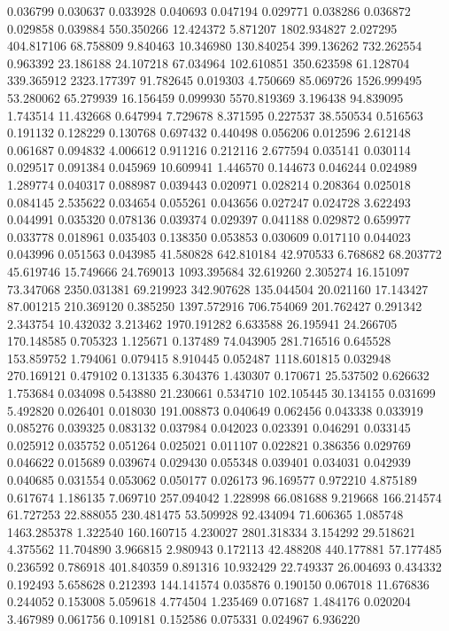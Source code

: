 0.036799
0.030637
0.033928
0.040693
0.047194
0.029771
0.038286
0.036872
0.029858
0.039884
550.350266
12.424372
5.871207
1802.934827
2.027295
404.817106
68.758809
9.840463
10.346980
130.840254
399.136262
732.262554
0.963392
23.186188
24.107218
67.034964
102.610851
350.623598
61.128704
339.365912
2323.177397
91.782645
0.019303
4.750669
85.069726
1526.999495
53.280062
65.279939
16.156459
0.099930
5570.819369
3.196438
94.839095
1.743514
11.432668
0.647994
7.729678
8.371595
0.227537
38.550534
0.516563
0.191132
0.128229
0.130768
0.697432
0.440498
0.056206
0.012596
2.612148
0.061687
0.094832
4.006612
0.911216
0.212116
2.677594
0.035141
0.030114
0.029517
0.091384
0.045969
10.609941
1.446570
0.144673
0.046244
0.024989
1.289774
0.040317
0.088987
0.039443
0.020971
0.028214
0.208364
0.025018
0.084145
2.535622
0.034654
0.055261
0.043656
0.027247
0.024728
3.622493
0.044991
0.035320
0.078136
0.039374
0.029397
0.041188
0.029872
0.659977
0.033778
0.018961
0.035403
0.138350
0.053853
0.030609
0.017110
0.044023
0.043996
0.051563
0.043985
41.580828
642.810184
42.970533
6.768682
68.203772
45.619746
15.749666
24.769013
1093.395684
32.619260
2.305274
16.151097
73.347068
2350.031381
69.219923
342.907628
135.044504
20.021160
17.143427
87.001215
210.369120
0.385250
1397.572916
706.754069
201.762427
0.291342
2.343754
10.432032
3.213462
1970.191282
6.633588
26.195941
24.266705
170.148585
0.705323
1.125671
0.137489
74.043905
281.716516
0.645528
153.859752
1.794061
0.079415
8.910445
0.052487
1118.601815
0.032948
270.169121
0.479102
0.131335
6.304376
1.430307
0.170671
25.537502
0.626632
1.753684
0.034098
0.543880
21.230661
0.534710
102.105445
30.134155
0.031699
5.492820
0.026401
0.018030
191.008873
0.040649
0.062456
0.043338
0.033919
0.085276
0.039325
0.083132
0.037984
0.042023
0.023391
0.046291
0.033145
0.025912
0.035752
0.051264
0.025021
0.011107
0.022821
0.386356
0.029769
0.046622
0.015689
0.039674
0.029430
0.055348
0.039401
0.034031
0.042939
0.040685
0.031554
0.053062
0.050177
0.026173
96.169577
0.972210
4.875189
0.617674
1.186135
7.069710
257.094042
1.228998
66.081688
9.219668
166.214574
61.727253
22.888055
230.481475
53.509928
92.434094
71.606365
1.085748
1463.285378
1.322540
160.160715
4.230027
2801.318334
3.154292
29.518621
4.375562
11.704890
3.966815
2.980943
0.172113
42.488208
440.177881
57.177485
0.236592
0.786918
401.840359
0.891316
10.932429
22.749337
26.004693
0.434332
0.192493
5.658628
0.212393
144.141574
0.035876
0.190150
0.067018
11.676836
0.244052
0.153008
5.059618
4.774504
1.235469
0.071687
1.484176
0.020204
3.467989
0.061756
0.109181
0.152586
0.075331
0.024967
6.936220
